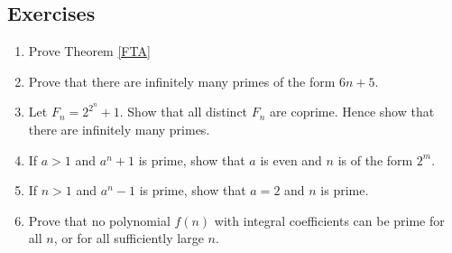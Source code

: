 \subsection{Exercises}
\begin{enumerate}
    \item Prove Theorem \ref{FTA}
    \item Prove that there are infinitely many primes of the form $6n+5$.
    \item Let $F_n = 2^{2^n} + 1$. Show that all distinct $F_n$ are coprime. Hence show that there are infinitely many primes.
    \item If $a>1$ and $a^n + 1$ is prime, show that $a$ is even and $n$ is of the form $2^m$.
    \item If $n>1$ and $a^n - 1$ is prime, show that $a=2$ and $n$ is prime.
    \item Prove that no polynomial $f(n)$ with integral coefficients can be prime for all $n$, or for all sufficiently large $n$.
\end{enumerate}
